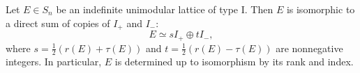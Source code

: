 Let $E \in S_n$ be an indefinite unimodular lattice of type I. Then $E$ is isomorphic to a direct sum of copies of $I_+$ and $I_-$:
$$
E \simeq s I_+ \oplus t I_-,
$$
where $s = \frac{1}{2}(r(E) + \tau(E))$ and $t = \frac{1}{2}(r(E) - \tau(E))$ are nonnegative integers. In particular, $E$ is determined up to isomorphism by its rank and index.
